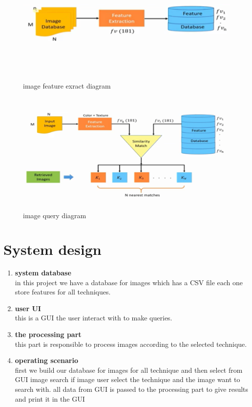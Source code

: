 \documentclass[pdftex,10pt,a4paper,oneside]{article}
\begin{document}
\begin{figure}[H]
	\centering
	\includegraphics[width=120mm,height=60mm]{fig/21.png}
	\caption{image feature exract diagram }
	\label{image feature exract diagram}
\end{figure}
\begin{figure}[H]
	\centering
	\includegraphics[width=120mm,height=60mm]{fig/20.png}
	\caption{image query diagram }
	\label{image query diagram}
\end{figure}
	\pagebreak
	\section{System design}
	\begin{enumerate}
		\item  \textbf{{\large system database}}\\
		in this project we have a database for images which has a CSV file each one store features for all techniques.
		
		
		\item \textbf{{\large user UI}} \\
		this is a GUI the user interact with to make queries.
		\item \textbf{{\large the processing part}}\\
		this part is responsible to process images according to the selected technique.
		\item \textbf{{\large  operating scenario}}\\
		 first we build our database for  images for all technique and then select from GUI  image search if image user select the technique and the image want to search with. all data from GUI is passed to the processing part to give results and print it in the GUI  
		
	\end{enumerate}
	
\end{document}
